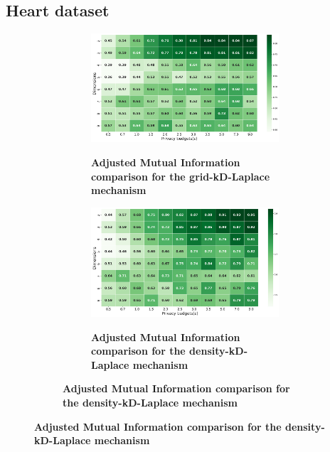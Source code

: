 \subsection{Heart dataset} \label{appendix:results-mechanism-utility-heart-dataset}
\begin{figure}[H]
    \centering
    \begin{subfigure}[b]{0.90\textwidth}
        \begin{subfigure}[c]{1\textwidth}
            \caption{\textbf{Adjusted Mutual Information comparison for the grid-kD-Laplace mechanism}}
            \includegraphics[width=1\textwidth]{Results/kd-laplace/grid-kd-Laplace/heart-dataset/ami.png}
            \label{fig:ami_heart-dataset_comparison_grid-kd_2d}
        \end{subfigure}
        \vfill %
        \begin{subfigure}[c]{1\textwidth}
            \caption{\textbf{Adjusted Mutual Information comparison for the density-kD-Laplace mechanism}}
            \includegraphics[width=1\textwidth]{Results/kd-laplace/density-kd-Laplace/heart-dataset/ami.png}
            \label{fig:ami_heart-dataset_comparison_density-kd_2d}
        \end{subfigure}
    \end{subfigure}
\end{figure}
\newpage
